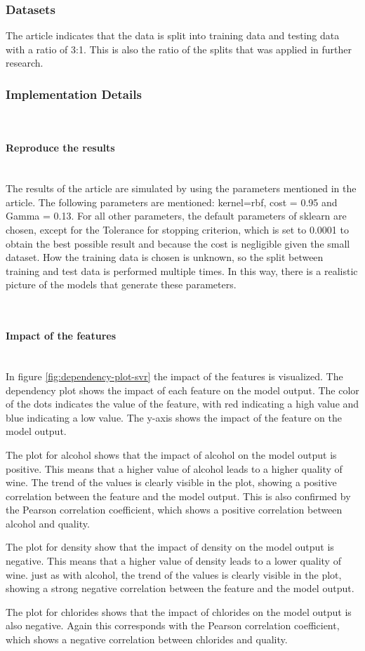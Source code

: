 \documentclass{article}
\newcommand{\subsubsubsection}[1]{%
  \paragraph{#1}\mbox{}\\}
\begin{document}
\subsubsection{Datasets}
The article indicates that the data is split into training data and testing data with a ratio of 3:1. This is also the ratio of the splits that was applied in further research.

\subsubsection{Implementation Details}

\subsubsubsection{Reproduce the results}
The results of the article are simulated by using the parameters mentioned in the article. The following parameters are mentioned: kernel=rbf, cost = 0.95 and Gamma = 0.13. For all other parameters, the default parameters of sklearn are chosen, except for the Tolerance for stopping criterion, which is set to 0.0001 to obtain the best possible result and because the cost is negligible given the small dataset.
How the training data is chosen is unknown, so the split between training and test data is performed multiple times. In this way, there is a realistic picture of the models that generate these parameters.

\subsubsubsection{Impact of the features}
In figure \ref{fig:dependency-plot-svr} the impact of the features is visualized.
The dependency plot shows the impact of each feature on the model output.
The color of the dots indicates the value of the feature, with red indicating a high value and blue indicating a low value.
The y-axis shows the impact of the feature on the model output.

The plot for alcohol shows that the impact of alcohol on the model output is positive.
This means that a higher value of alcohol leads to a higher quality of wine.
The trend of the values is clearly visible in the plot, showing a positive correlation between the feature and the model output.
This is also confirmed by the Pearson correlation coefficient, which shows a positive correlation between alcohol and quality.

The plot for density show that the impact of density on the model output is negative.
This means that a higher value of density leads to a lower quality of wine.
just as with alcohol, the trend of the values is clearly visible in the plot, showing a strong negative correlation between the feature and the model output.

The plot for chlorides shows that the impact of chlorides on the model output is also negative. Again this corresponds with the Pearson correlation coefficient, which shows a negative correlation between chlorides and quality.
\end{document}

